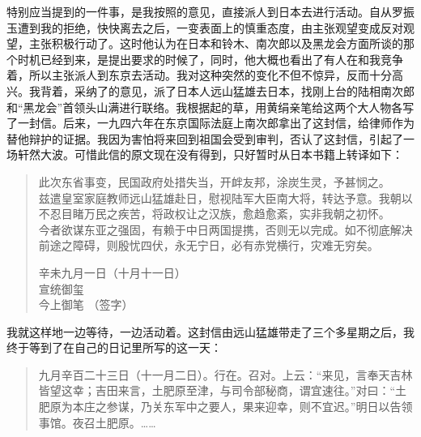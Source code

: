 特别应当提到的一件事，是我按照的意见，直接派人到日本去进行活动。自从罗振玉遭到我的拒绝，快快离去之后，一变表面上的慎重态度，由主张观望变成反对观望，主张积极行动了。这时他认为在日本和铃木、南次郎以及黑龙会方面所谈的那个时机已经到来，是提出要求的时候了，同时，他大概也看出了有人在和我竞争着，所以主张派人到东京去活动。我对这种突然的变化不但不惊异，反而十分高兴。我背着，采纳了的意见，派了日本人远山猛雄去日本，找刚上台的陆相南次郎和“黑龙会”首领头山满进行联络。我根据起的草，用黄绢亲笔给这两个大人物各写了一封信。后来，一九四六年在东京国际法庭上南次郎拿出了这封信，给律师作为替他辩护的证据。我因为害怕将来回到祖国会受到审判，否认了这封信，引起了一场轩然大波。可惜此信的原文现在没有得到，只好暂时从日本书籍上转译如下：\\

\begin{quote}
	此次东省事变，民国政府处措失当，开衅友邦，涂炭生灵，予甚悯之。\\

兹遣皇室家庭教师远山猛雄赴日，慰视陆军大臣南大将，转达予意。我朝以不忍目睹万民之疾苦，将政权让之汉族，愈趋愈紊，实非我朝之初怀。\\

今者欲谋东亚之强固，有赖于中日两国提携，否则无以完成。如不彻底解决前途之障碍，则殷忧四伏，永无宁日，必有赤党横行，灾难无穷矣。\\

\begin{flushright}
	辛未九月一日（十月十一日）\\

宣统御玺\\

今上御笔       （签字）\\
\end{flushright}
\end{quote}

我就这样地一边等待，一边活动着。这封信由远山猛雄带走了三个多星期之后，我终于等到了在自己的日记里所写的这一天：\\

\begin{quote}
	九月辛百二十三日（十一月二日）。行在。召对。上云：“来见，言奉天吉林皆望这幸；吉田来言，土肥原至津，与司令部秘商，谓宜速往。”对曰：“土肥原为本庄之参谋，乃关东军中之要人，果来迎幸，则不宜迟。”明日以告领事馆。夜召土肥原。……\\
\end{quote}
